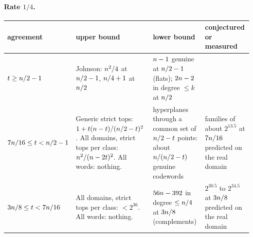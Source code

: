 \paragraph{Rate $1/4$.}
{\small
\begin{longtable}{@{}L{0.15\textwidth}L{0.33\textwidth}L{0.27\textwidth}L{0.17\textwidth}@{}}
\toprule
agreement & upper bound & lower bound & conjectured or measured\\
\midrule
\endhead
$t\ge n/2-1$ & Johnson: $n^2/4$ at $n/2-1$, $n/4+1$ at $n/2$ & $n-1$ genuine at $n/2-1$ (flats); $2n-2$ in degree $\le k$ at $n/2$ & \\
\addlinespace
$7n/16\le t<n/2-1$ & Generic strict tops: $1+t(n-t)/(n/2-t)^2$. All domains, strict tops per class: $n^2/(n-2t)^2$. All words: nothing. & hyperplanes through a common set of $n/2-t$ points: about $n/(n/2-t)$ genuine codewords & families of about $2^{13.5}$ at $7n/16$ predicted on the real domain\\
\addlinespace
$3n/8\le t<7n/16$ & All domains, strict tops per class: $<2^{36}$. All words: nothing. & $56n-392$ in degree $\le n/4$ at $3n/8$ (complements) & $2^{30.5}$ to $2^{34.5}$ at $3n/8$ predicted on the real domain\\
\bottomrule
\end{longtable}}


